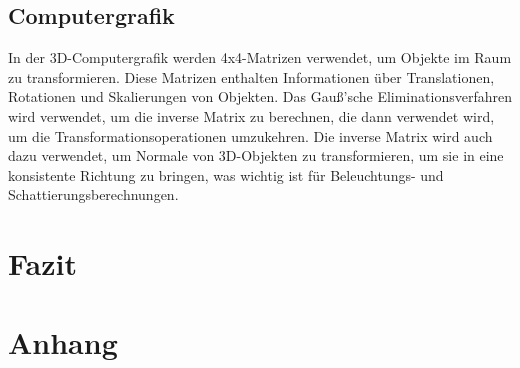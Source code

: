 \documentclass[a4paper, 12pt]{report}
\begin{document}
\begin{sloppypar}
\section{Computergrafik}
In der 3D-Computergrafik werden 4x4-Matrizen verwendet, um Objekte im Raum zu transformieren.
Diese Matrizen enthalten Informationen über Translationen, Rotationen und Skalierungen von Objekten.
Das Gauß'sche Eliminationsverfahren wird verwendet, um die inverse Matrix zu berechnen, die dann verwendet wird,
um die Transformationsoperationen umzukehren. Die inverse Matrix wird auch dazu verwendet, um Normale von 3D-Objekten zu transformieren,
um sie in eine konsistente Richtung zu bringen, was wichtig ist für Beleuchtungs- und Schattierungsberechnungen.

{\let\clearpage\relax \chapter{Fazit}}
\chapter*{Anhang}
\footnotesize

\printbibliography
\end{sloppypar}
\end{document}
